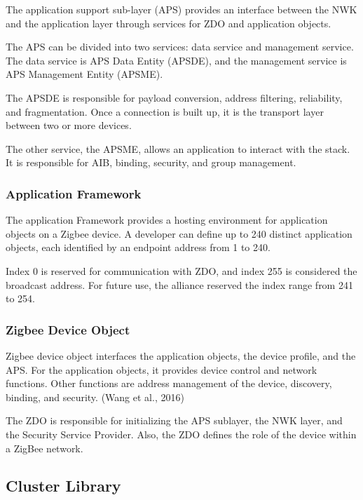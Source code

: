 The application support sub-layer (APS) provides an interface between the NWK and the application layer through services for ZDO and application objects. 

The APS can be divided into two services: data service and management service. The data service is APS Data Entity (APSDE), and the management service is APS Management Entity (APSME).

The APSDE is responsible for payload conversion, address filtering, reliability, and fragmentation. Once a connection is built up, it is the transport layer between two or more devices.

The other service, the APSME, allows an application to interact with the stack. It is responsible for AIB, binding, security, and group management.


\subsubsection{Application Framework}

The application Framework provides a hosting environment for application objects on a Zigbee device.
A developer can define up to 240 distinct application objects, each identified by an endpoint address from 1 to 240. 

Index 0 is reserved for communication with ZDO, and index 255 is considered the broadcast address.
For future use, the alliance reserved the index range from 241 to 254.

\subsubsection{Zigbee Device Object}
Zigbee device object interfaces the application objects, the device profile, and the APS.
For the application objects, it provides device control and network functions.
Other functions are address management of the device, discovery, binding, and security. (Wang et al., 2016)

The ZDO is responsible for initializing the APS sublayer, the NWK layer, and the Security Service Provider. Also, the ZDO defines the role of the device within a ZigBee network.

\subsection{Cluster Library}


